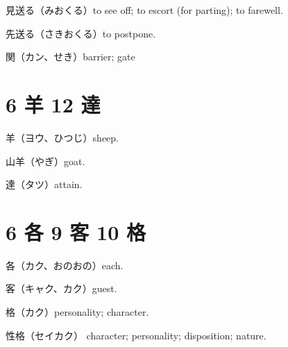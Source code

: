 見送る（みおくる）to see off; to escort (for parting); to farewell.

先送る（さきおくる）to postpone.

関（カン、せき）barrier; gate

\section{6 羊 12 達}

羊（ヨウ、ひつじ）sheep.

山羊（やぎ）goat.

達（タツ）attain.

\section{6 各 9 客 10 格}

各（カク、おのおの）each.

客（キャク、カク）guest.

格（カク）personality; character.

性格（セイカク）
character; personality; disposition; nature.
